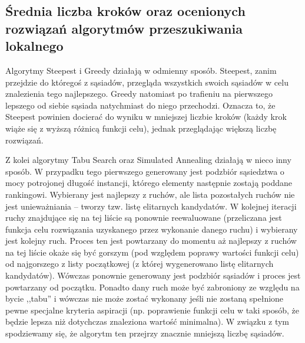\subsection{Średnia liczba kroków oraz ocenionych rozwiązań algorytmów przeszukiwania lokalnego}
Algorytmy Steepest i Greedy działają w odmienny sposób. Steepest, zanim przejdzie do któregoś z sąsiadów, przegląda wszystkich swoich sąsiadów w celu znalezienia tego najlepszego. Greedy natomiast po trafieniu na pierwszego lepszego od siebie sąsiada natychmiast do niego przechodzi. Oznacza to, że Steepest powinien docierać do wyniku w mniejszej liczbie kroków (każdy krok wiąże się z wyższą różnicą funkcji celu), jednak przeglądając większą liczbę rozwiązań.

Z kolei algorytmy Tabu Search oraz Simulated Annealing działają w nieco inny sposób. W przypadku tego pierwszego generowany jest podzbiór sąsiedztwa o mocy potrojonej długość instancji, którego elementy następnie zostają poddane rankingowi. Wybierany jest najlepszy z ruchów, ale lista pozostałych ruchów nie jest unieważniania -- tworzy tzw. listę elitarnych kandydatów. W kolejnej iteracji ruchy znajdujące się na tej liście są ponownie reewaluowane (przeliczana jest funkcja celu rozwiązania uzyskanego przez wykonanie danego ruchu) i wybierany jest kolejny ruch. Proces ten jest powtarzany do momentu aż najlepszy z ruchów na tej liście okaże się być gorszym (pod względem poprawy wartości funkcji celu) od najgorszego z listy początkowej (z której wygenerowano listę elitarnych kandydatów). Wówczas ponownie generowany jest podzbiór sąsiadów i proces jest powtarzany od początku. Ponadto dany ruch może być zabroniony ze względu na bycie ,,tabu'' i wówczas nie może zostać wykonany jeśli nie zostaną spełnione pewne specjalne kryteria aspiracji (np. poprawienie funkcji celu w taki sposób, że będzie lepsza niż dotychczas znaleziona wartość minimalna). W związku z tym spodziewamy się, że algorytm ten przejrzy znacznie mniejszą liczbę sąsiadów.

